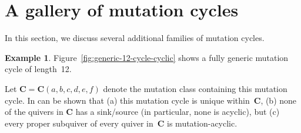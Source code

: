 \documentclass[11pt, letterpaper]{amsart}
\theoremstyle{definition}
\newtheorem{example}[theorem]{Example}
\numberwithin{equation}{section}
\begin{document}
\newpage

\section{A gallery of mutation cycles}
\label{sec:moreCycles}

In this section, we discuss several additional families of mutation cycles. 

\begin{example}
\label{eg:rosette}
Figure~\ref{fig:generic-12-cycle-cyclic} shows a fully generic mutation cycle of length~12. 

Let $\mathbf{C}=\mathbf{C}(a,b,c,d,e,f)$ denote the mutation class containing this mutation cycle. 
In can be shown that (a) this mutation cycle is unique within~$\mathbf{C}$, 
(b) none of the quivers in $\mathbf{C}$ has a sink/source (in particular, none is acyclic), but 
(c) every proper subquiver of every quiver in~$\mathbf{C}$ is mutation-acyclic. 
\end{example}

\newcommand{\sepps}{3.5em}
\newcommand{\outsepd}{-1}
\newcommand{\outsepe}{-1.5}
\end{document}

